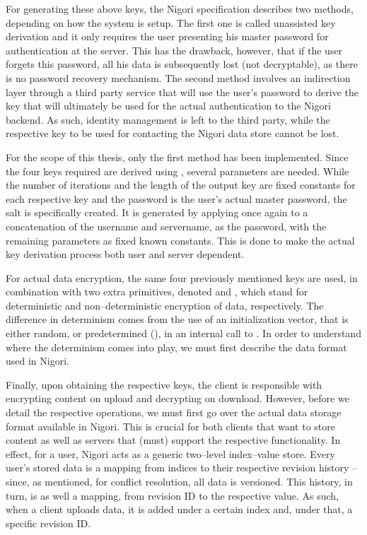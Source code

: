 For generating these above keys, the Nigori specification describes two methods, depending on how the system is setup.
The first one is called unassisted key derivation and it only requires the user presenting his master password for authentication at the server.
This has the drawback, however, that if the user forgets this password, all his data is subsequently lost (not decryptable), as there is no password recovery mechanism.
The second method involves an indirection layer through a third party service that will use the user's password to derive the key that will ultimately be used for the actual authentication to the Nigori backend.
As such, identity management is left to the third party, while the respective key to be used for contacting the Nigori data store cannot be lost.

For the scope of this thesis, only the first method has been implemented.
Since the four keys required are derived using , several parameters are needed.
While the number of iterations and the length of the output key are fixed constants for each respective key and the password is the user's actual master password, the salt is specifically created.
It is generated by applying  once again to a concatenation of the username and servername, as the password, with the remaining parameters as fixed known constants.
This is done to make the actual key derivation process both user and server dependent.

For actual data encryption, the same four previously mentioned keys are used, in combination with two extra primitives, denoted  and , which stand for deterministic and non--deterministic encryption of data, respectively.
The difference in determinism comes from the use of an initialization vector, that is either random, or predetermined (), in an internal call to .
In order to understand where the determinism comes into play, we must first describe the data format used in Nigori.

Finally, upon obtaining the respective keys, the client is responsible with encrypting content on upload and decrypting on download.
However, before we detail the respective operations, we must first go over the actual data storage format available in Nigori.
This is crucial for both clients that want to store content as well as servers that (must) support the respective functionality.
In effect, for a user, Nigori acts as a generic two--level index--value store.
Every user's stored data is a mapping from indices to their respective revision history -- since, as mentioned, for conflict resolution, all data is versioned.
This history, in turn, is as well a mapping, from revision ID to the respective value.
As such, when a client uploads data, it is added under a certain index and, under that, a specific revision ID.

